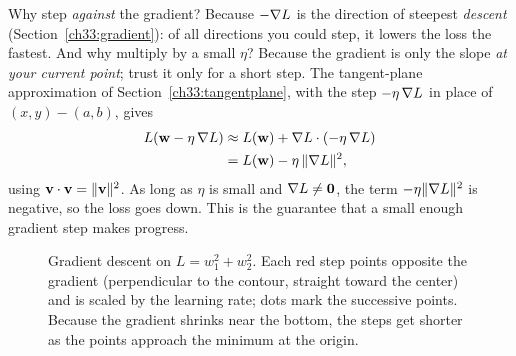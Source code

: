 \begin{intuitionbox}
Why step \emph{against} the gradient? Because $-\nabla L$ is the direction of
steepest \emph{descent} (Section~\ref{ch33:gradient}): of all directions you could
step, it lowers the loss the fastest. And why multiply by a small $\eta$? Because
the gradient is only the slope \emph{at your current point}; trust it only for a
short step. The tangent-plane approximation of Section~\ref{ch33:tangentplane},
with the step $-\eta\,\nabla L$ in place of $(x,y)-(a,b)$, gives
\begin{align*}
  L(\mathbf{w} - \eta\,\nabla L)
  &\approx L(\mathbf{w}) + \nabla L\cdot(-\eta\,\nabla L)\\
  &= L(\mathbf{w}) - \eta\,\lVert\nabla L\rVert^2,
\end{align*}
using $\mathbf{v}\cdot\mathbf{v}=\lVert\mathbf{v}\rVert^2$. As long as $\eta$ is small and
$\nabla L\neq\mathbf{0}$, the term $-\eta\lVert\nabla L\rVert^2$ is negative, so the loss
goes down. This is the guarantee that a small enough gradient step makes progress.
\end{intuitionbox}

\begin{figure}[H]
\centering
{}
\caption{Gradient descent on $L=w_1^2+w_2^2$. Each red step points opposite the
gradient (perpendicular to the contour, straight toward the center) and is scaled
by the learning rate; dots mark the successive points. Because the gradient shrinks near the bottom, the steps get
shorter as the points approach the minimum at the origin.}
\label{ch33:fig-gd}
\end{figure}

